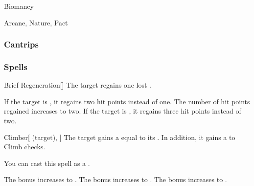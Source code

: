 \newpage
\begin{spellsection}{Biomancy}

\begin{spellheader}
\end{spellheader}


 Arcane, Nature, Pact

\subsubsection{Cantrips}


\end{spellsection}


\subsubsection{Spells}


\lowercase{\hypertarget{spell:Brief Regeneration}{}}\label{spell:Brief Regeneration}
\begin{freeability}[Rank 1]{\hypertarget{spell:Brief Regeneration}{Brief Regeneration}}[]
The target regains one lost .

\rankline
{} If the target is , it regains two hit points instead of one.
 The number of hit points regained increases to two.
 If the target is , it regains three hit points instead of two.
\end{freeability}
\vspace{0.25em}



\lowercase{\hypertarget{spell:Climber}{}}\label{spell:Climber}
\begin{attuneability}[Rank 1]{\hypertarget{spell:Climber}{Climber}}[ (target), ]
The target gains a  equal to its .
In addition, it gains a   to Climb checks.

You can cast this spell as a .

\rankline
{} The bonus increases to .
 The bonus increases to .
 The bonus increases to .
\end{attuneability}
\vspace{0.25em}




